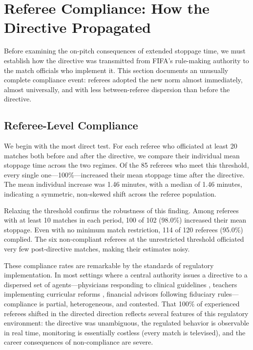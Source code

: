 

\section{Referee Compliance: How the Directive Propagated}
\label{sec:referee_compliance}

Before examining the on-pitch consequences of extended stoppage time, we must establish how the directive was transmitted from FIFA's rule-making authority to the match officials who implement it.  This section documents an unusually complete compliance event: referees adopted the new norm almost immediately, almost universally, and with less between-referee dispersion than before the directive.

\subsection{Referee-Level Compliance}
\label{sec:ref_level_compliance}

We begin with the most direct test.  For each referee who officiated at least 20 matches both before and after the directive, we compare their individual mean stoppage time across the two regimes.  Of the 85 referees who meet this threshold, every single one---100\%---increased their mean stoppage time after the directive.  The mean individual increase was 1.46 minutes, with a median of 1.46 minutes, indicating a symmetric, non-skewed shift across the referee population.

Relaxing the threshold confirms the robustness of this finding.  Among referees with at least 10 matches in each period, 100 of 102 (98.0\%) increased their mean stoppage.  Even with no minimum match restriction, 114 of 120 referees (95.0\%) complied.  The six non-compliant referees at the unrestricted threshold officiated very few post-directive matches, making their estimates noisy.

These compliance rates are remarkable by the standards of regulatory implementation.  In most settings where a central authority issues a directive to a dispersed set of agents---physicians responding to clinical guidelines \citep{cabana1999}, teachers implementing curricular reforms \citep{cohen1990}, financial advisors following fiduciary rules---compliance is partial, heterogeneous, and contested.  That 100\% of experienced referees shifted in the directed direction reflects several features of this regulatory environment: the directive was unambiguous, the regulated behavior is observable in real time, monitoring is essentially costless (every match is televised), and the career consequences of non-compliance are severe.

